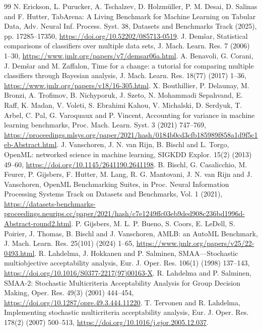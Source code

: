 \documentclass[preprint,11pt]{elsarticle}
\begin{document}
\begin{thebibliography}{99}
 N. Erickson, L. Purucker, A. Tschalzev, D. Holzm\"uller, P. M. Desai, D. Salinas and F. Hutter, TabArena: A Living Benchmark for Machine Learning on Tabular Data, Adv. Neural Inf. Process. Syst. 38, Datasets and Benchmarks Track (2025), pp. 17285--17350, \url{https://doi.org/10.52202/085713-0519}.
 J. Dem\v{s}ar, Statistical comparisons of classifiers over multiple data sets, J. Mach. Learn. Res. 7 (2006) 1--30, \url{https://www.jmlr.org/papers/v7/demsar06a.html}.
 A. Benavoli, G. Corani, J. Dem\v{s}ar and M. Zaffalon, Time for a change: a tutorial for comparing multiple classifiers through Bayesian analysis, J. Mach. Learn. Res. 18(77) (2017) 1--36, \url{https://www.jmlr.org/papers/v18/16-305.html}.
 X. Bouthillier, P. Delaunay, M. Bronzi, A. Trofimov, B. Nichyporuk, J. Szeto, N. Mohammadi Sepahvand, E. Raff, K. Madan, V. Voleti, S. Ebrahimi Kahou, V. Michalski, D. Serdyuk, T. Arbel, C. Pal, G. Varoquaux and P. Vincent, Accounting for variance in machine learning benchmarks, Proc. Mach. Learn. Syst. 3 (2021) 747--769, \url{https://proceedings.mlsys.org/paper/2021/hash/0184b0cd3cfb185989f858a1d9f5c1eb-Abstract.html}.
 J. Vanschoren, J. N. van Rijn, B. Bischl and L. Torgo, OpenML: networked science in machine learning, SIGKDD Explor. 15(2) (2013) 49--60, \url{https://doi.org/10.1145/2641190.2641198}.
 B. Bischl, G. Casalicchio, M. Feurer, P. Gijsbers, F. Hutter, M. Lang, R. G. Mantovani, J. N. van Rijn and J. Vanschoren, OpenML Benchmarking Suites, in Proc. Neural Information Processing Systems Track on Datasets and Benchmarks, Vol. 1 (2021), \url{https://datasets-benchmarks-proceedings.neurips.cc/paper/2021/hash/c7e1249ffc03eb9ded908c236bd1996d-Abstract-round2.html}.
 P. Gijsbers, M. L. P. Bueno, S. Coors, E. LeDell, S. Poirier, J. Thomas, B. Bischl and J. Vanschoren, AMLB: an AutoML Benchmark, J. Mach. Learn. Res. 25(101) (2024) 1--65, \url{https://www.jmlr.org/papers/v25/22-0493.html}.
 R. Lahdelma, J. Hokkanen and P. Salminen, SMAA---Stochastic multiobjective acceptability analysis, Eur. J. Oper. Res. 106(1) (1998) 137--143, \url{https://doi.org/10.1016/S0377-2217(97)00163-X}.
 R. Lahdelma and P. Salminen, SMAA-2: Stochastic Multicriteria Acceptability Analysis for Group Decision Making, Oper. Res. 49(3) (2001) 444--454, \url{https://doi.org/10.1287/opre.49.3.444.11220}.
 T. Tervonen and R. Lahdelma, Implementing stochastic multicriteria acceptability analysis, Eur. J. Oper. Res. 178(2) (2007) 500--513, \url{https://doi.org/10.1016/j.ejor.2005.12.037}.

\end{thebibliography}
\end{document}
